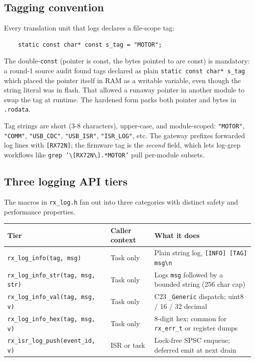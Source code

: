 \subsection{Tagging convention}

Every translation unit that logs declares a file-scope tag:

\begin{verbatim}
    static const char* const s_tag = "MOTOR";
\end{verbatim}

The double-\texttt{const} (pointer is const, the bytes pointed to are
const) is mandatory: a round-1 source audit found tags declared as
plain \texttt{static const char* s\_tag} which placed the pointer
itself in RAM as a writable variable, even though the string literal
was in flash. That allowed a runaway pointer in another module to swap
the tag at runtime. The hardened form parks both pointer and bytes in
\texttt{.rodata}.

Tag strings are short (3-8 characters), upper-case, and module-scoped:
\texttt{"MOTOR"}, \texttt{"COMM"}, \texttt{"USB\_CDC"},
\texttt{"USB\_ISR"}, \texttt{"ISR\_LOG"}, etc. The gateway prefixes
forwarded log lines with \texttt{[RX72N]}; the firmware tag is the
\textit{second} field, which lets log-grep workflows like
\texttt{grep '\textbackslash[RX72N\textbackslash].*MOTOR'} pull
per-module subsets.

\subsection{Three logging API tiers}

The macros in \texttt{rx\_log.h} fan out into three categories with
distinct safety and performance properties.

\begin{center}
\begin{tabular}{|p{4.6cm}|p{4.0cm}|p{6.0cm}|}
\hline
\textbf{Tier}                              & \textbf{Caller context}    & \textbf{What it does}                                        \\
\hline
\texttt{rx\_log\_info(tag, msg)}           & Task only                  & Plain string log, \texttt{[INFO] [TAG] msg\textbackslash n}  \\
\texttt{rx\_log\_info\_str(tag, msg, str)} & Task only                  & Logs \texttt{msg} followed by a bounded string (256 char cap) \\
\texttt{rx\_log\_info\_val(tag, msg, v)}   & Task only                  & C23 \texttt{\_Generic} dispatch; uint8 / 16 / 32 decimal      \\
\texttt{rx\_log\_info\_hex(tag, msg, v)}   & Task only                  & 8-digit hex; common for \texttt{rx\_err\_t} or register dumps \\
\texttt{rx\_isr\_log\_push(event\_id, v)}  & ISR or task                & Lock-free SPSC enqueue; deferred emit at next drain          \\
\hline
\end{tabular}
\end{center}


